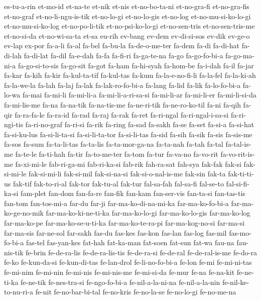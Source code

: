 {es-tu-a-rin et-mo-id et-na-te et-nik et-nis et-no-bo-ta-ni et-no-gra-fi
et-no-gra-fis et-no-graf et-no-li-ngu-is-tik et-no-lo-gi et-no-lo-gis
et-no-log et-no-mu-si-ko-lo-gi et-no-mu-si-ko-log et-no-po-li-tik
et-no-psi-ko-lo-gi et-no-sen-tris et-no-sen-tris-me et-no-si-da
et-no-wi-sa-ta et-sa eu-rih ev-bang ev-dem ev-di-si-sos ev-dik ev-ge-o
ev-lap ex-por fa-a-li fa-al fa-bel fa-bu-la fa-de-o-me-ter fa-dem fa-di
fa-di-hat fa-di-lah fa-di-lat fa-dil fa-e-dah fa-fa fa-fi-ri fa-ga-te-na
fa-go fa-go-fo-bi-a fa-go-ma-ni-a fa-go-si-to-sis fa-go-sit fa-got fa-ham
fa-hi-syah fa-hom-be fa-i-dah fa-il fa-jar fa-kar fa-kih fa-kir
fa-kul-ta-tif fa-kul-tas fa-kum fa-la-e-no-fi-li fa-la-fel fa-la-ki-ah
fa-la-we-la fa-lah fa-laj fa-lak fa-lak-ro-fo-bi-a fa-lang fa-lid fa-lik
fa-lo-fo-bi-a fa-lo-wa fa-mai fa-mi-li fa-mi-li-a fa-mi-li-a-ri-sa-si
fa-mi-li-ar fa-mi-li-er fa-mi-li-si-da fa-mi-lis-me fa-na fa-na-tik
fa-na-tis-me fa-ne-ri-tik fa-ne-ro-ko-til fa-ni fa-qih fa-qir fa-ra-fa-le
fa-ra-id fa-rad fa-raj fa-rak fa-ret fa-ri-ngal fa-ri-ngal-i-sa-si
fa-ri-ngi-tis fa-ri-no-graf fa-ri-si fa-rik fa-ring fa-sad fa-sakh fa-se
fa-set fa-si-a fa-si-hat fa-si-ku-lus fa-si-li-ta-si fa-si-li-ta-tor
fa-si-li-tas fa-sid fa-sih fa-sik fa-sis fa-sis-me fa-sos fa-sum
fa-ta-li-tas fa-ta-lis fa-ta-mor-ga-na fa-ta-nah fa-tah fa-tal
fa-tal-is-me fa-te-le fa-ti-hah fa-tir fa-to-me-ter fa-tom fa-tur fa-va-no
fa-vo-rit fa-vo-rit-is-me fa-xi-mi-le fab-ri-ga-mi fab-ri-ka-si fab-rik
fah-ra-sat fah-sya fak-fak fak-si fak-si-mi-le fak-si-mi-li fak-si-mil
fak-si-na-si fak-si-o-nal-is-me fak-sin fak-ta fak-ti-ti-us fak-tif
fak-to-ri-al fak-tor fak-tu-al fak-tur fal-sa-fah fal-sa-fi fal-se-to
fal-si-fi-ka-si fam-plet fan-dom fan-fa-re fan-fik fan-kam fan-ser-vis
fan-ta-si fan-tas-tis fan-tom fan-tos-mi-a far-du far-ji
far-ma-ko-di-na-mi-ka far-ma-ko-fo-bi-a far-ma-ko-ge-no-mik
far-ma-ko-ki-ne-ti-ka far-ma-ko-lo-gi far-ma-ko-lo-gis far-ma-ko-log
far-ma-ko-pe far-ma-ko-se-u-ti-ka far-ma-ko-te-ra-pi far-ma-kog-no-si
far-ma-si far-ma-sis far-ne-sol far-sakh fas-du fas-kes fas-kon fas-lan
fas-log fas-mil fas-mo-fo-bi-a fas-tel fas-yan-kes fat-hah fat-ka-man
fat-soen fat-sun fat-wa fau-na fau-nis-tik fe-brin fe-de-ra-lis
fe-de-ra-lis-tis fe-de-ra-si fe-de-ral fe-de-ral-is-me fe-do-ra fe-ko
fe-kun-da-si fe-kun-di-tas fe-lan-drol fe-li-no-fo-bi-a fe-lon fe-mi
fe-mi-ni-tas fe-mi-nim fe-mi-nin fe-mi-nis fe-mi-nis-me fe-mi-si-da fe-mur
fe-na fe-na-kit fe-ne-ti-ka fe-ne-tik fe-nes-tra-si fe-ngo-fo-bi-a
fe-nil-a-la-ni-na fe-nil-a-la-nin fe-nil-ke-to-nu-ri-a fe-nit
fe-no-bar-bi-tal fe-no-kris fe-no-la-se fe-no-lo-gi fe-no-me-na
}
